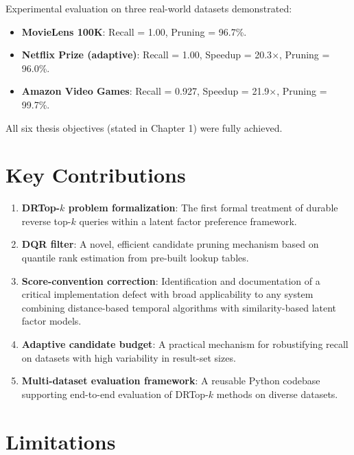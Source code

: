 Experimental evaluation on three real-world datasets demonstrated:
\begin{itemize}
  \item \textbf{MovieLens 100K}: Recall = 1.00, Pruning = 96.7\%.
  \item \textbf{Netflix Prize (adaptive)}: Recall = 1.00, Speedup = 20.3$\times$, Pruning = 96.0\%.
  \item \textbf{Amazon Video Games}: Recall = 0.927, Speedup = 21.9$\times$, Pruning = 99.7\%.
\end{itemize}

All six thesis objectives (stated in Chapter 1) were fully achieved.

\section{Key Contributions}

\begin{enumerate}
  \item \textbf{DRTop-$k$ problem formalization}: The first formal treatment of durable reverse top-$k$ queries within a latent factor preference framework.
  \item \textbf{DQR filter}: A novel, efficient candidate pruning mechanism based on quantile rank estimation from pre-built lookup tables.
  \item \textbf{Score-convention correction}: Identification and documentation of a critical implementation defect with broad applicability to any system combining distance-based temporal algorithms with similarity-based latent factor models.
  \item \textbf{Adaptive candidate budget}: A practical mechanism for robustifying recall on datasets with high variability in result-set sizes.
  \item \textbf{Multi-dataset evaluation framework}: A reusable Python codebase supporting end-to-end evaluation of DRTop-$k$ methods on diverse datasets.
\end{enumerate}

\section{Limitations}

